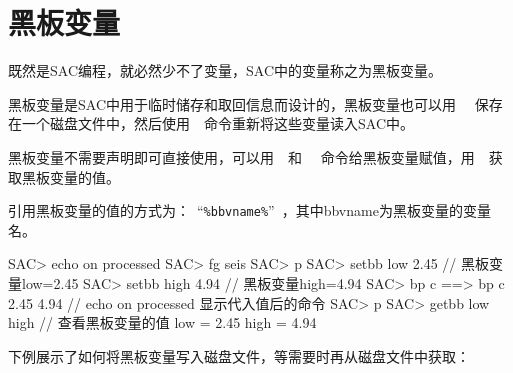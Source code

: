 \section{黑板变量}
既然是SAC编程，就必然少不了变量，SAC中的变量称之为黑板变量。

黑板变量是SAC中用于临时储存和取回信息而设计的，黑板变量也可以用~~
保存在一个磁盘文件中，然后使用~~命令重新将这些变量读入SAC中。

黑板变量不需要声明即可直接使用，可以用~~和~~
命令给黑板变量赋值，用~~获取黑板变量的值。

引用黑板变量的值的方式为：~``\lstinline{%bbvname%}''~，其中bbvname为黑板变量的变量名。

\begin{SACCode}
SAC> echo on processed          
SAC> fg seis
SAC> p
SAC> setbb low 2.45         // 黑板变量low=2.45
SAC> setbb high 4.94        // 黑板变量high=4.94
SAC> bp c %
 ==>  bp c 2.45 4.94        // echo on processed 显示代入值后的命令
SAC> p
SAC> getbb low high         // 查看黑板变量的值
 low = 2.45
 high = 4.94
\end{SACCode}

下例展示了如何将黑板变量写入磁盘文件，等需要时再从磁盘文件中获取：
